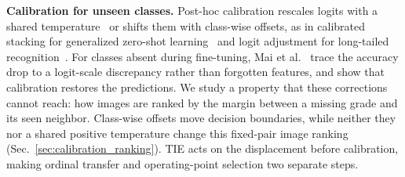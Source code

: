 \noindent\textbf{Calibration for unseen classes.}
Post-hoc calibration rescales logits with a shared temperature~\cite{guo2017calibration} or shifts them with class-wise offsets, as in calibrated stacking for generalized zero-shot learning~\cite{chao2016gzsl} and logit adjustment for long-tailed recognition~\cite{menon2021logit}.
For classes absent during fine-tuning, Mai et al.~\cite{mai2024fine} trace the accuracy drop to a logit-scale discrepancy rather than forgotten features, and show that calibration restores the predictions.
We study a property that these corrections cannot reach: how images are ranked by the margin between a missing grade and its seen neighbor.
Class-wise offsets move decision boundaries, while neither they nor a shared positive temperature change this fixed-pair image ranking (Sec.~\ref{sec:calibration_ranking}).
TIE acts on the displacement before calibration, making ordinal transfer and operating-point selection two separate steps.
